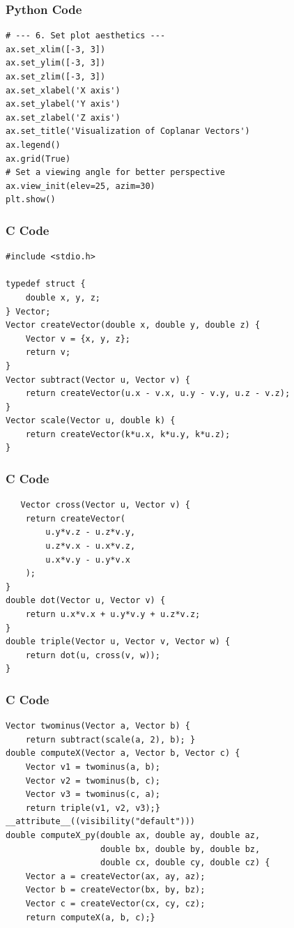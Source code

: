 \documentclass{beamer}
\begin{document}
\begin{frame}[fragile]
    \frametitle{Python Code}
    \begin{lstlisting}
# --- 6. Set plot aesthetics ---
ax.set_xlim([-3, 3])
ax.set_ylim([-3, 3])
ax.set_zlim([-3, 3])
ax.set_xlabel('X axis')
ax.set_ylabel('Y axis')
ax.set_zlabel('Z axis')
ax.set_title('Visualization of Coplanar Vectors')
ax.legend()
ax.grid(True)
# Set a viewing angle for better perspective
ax.view_init(elev=25, azim=30)
plt.show()
\end{lstlisting}
\end{frame}

\begin{frame}[fragile]
\frametitle{C Code}
\begin{lstlisting}
#include <stdio.h>

typedef struct {
    double x, y, z;
} Vector;
Vector createVector(double x, double y, double z) {
    Vector v = {x, y, z};
    return v;
}
Vector subtract(Vector u, Vector v) {
    return createVector(u.x - v.x, u.y - v.y, u.z - v.z);
}
Vector scale(Vector u, double k) {
    return createVector(k*u.x, k*u.y, k*u.z);
}
\end{lstlisting}

\end{frame}
\begin{frame}[fragile]
\frametitle{C Code}
\begin{lstlisting}
   Vector cross(Vector u, Vector v) {
    return createVector(
        u.y*v.z - u.z*v.y,
        u.z*v.x - u.x*v.z,
        u.x*v.y - u.y*v.x
    );
}
double dot(Vector u, Vector v) {
    return u.x*v.x + u.y*v.y + u.z*v.z;
}
double triple(Vector u, Vector v, Vector w) {
    return dot(u, cross(v, w));
}
\end{lstlisting}
\end{frame}
\begin{frame}[fragile]
\frametitle{C Code}
\begin{lstlisting}
Vector twominus(Vector a, Vector b) {
    return subtract(scale(a, 2), b); }
double computeX(Vector a, Vector b, Vector c) {
    Vector v1 = twominus(a, b);
    Vector v2 = twominus(b, c);
    Vector v3 = twominus(c, a);
    return triple(v1, v2, v3);}
__attribute__((visibility("default"))) 
double computeX_py(double ax, double ay, double az,
                   double bx, double by, double bz,
                   double cx, double cy, double cz) {
    Vector a = createVector(ax, ay, az);
    Vector b = createVector(bx, by, bz);
    Vector c = createVector(cx, cy, cz);
    return computeX(a, b, c);}
\end{lstlisting}

\end{frame}
\end{document}
